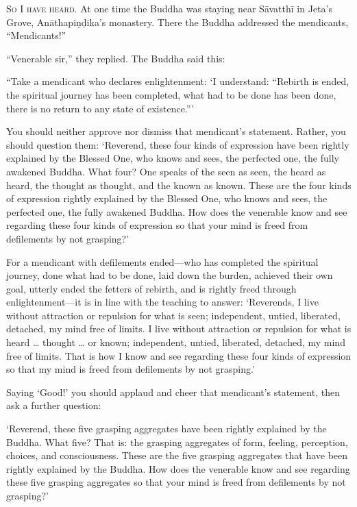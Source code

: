 \documentclass[12pt,openany]{book}%
\newcommand*{\scevam}[1]{\textsc{#1}}
\begin{document}
\scevam{So I have heard. }At one time the Buddha was staying near \textsanskrit{Sāvatthī} in Jeta’s Grove, \textsanskrit{Anāthapiṇḍika}’s monastery. There the Buddha addressed the mendicants, “Mendicants!” 

“Venerable sir,” they replied. The Buddha said this: 

“Take a mendicant who declares enlightenment: ‘I understand: “Rebirth is ended, the spiritual journey has been completed, what had to be done has been done, there is no return to any state of existence.”’ 

You should neither approve nor dismiss that mendicant’s statement. Rather, you should question them: ‘Reverend, these four kinds of expression have been rightly explained by the Blessed One, who knows and sees, the perfected one, the fully awakened Buddha. What four? One speaks of the seen as seen, the heard as heard, the thought as thought, and the known as known. These are the four kinds of expression rightly explained by the Blessed One, who knows and sees, the perfected one, the fully awakened Buddha. How does the venerable know and see regarding these four kinds of expression so that your mind is freed from defilements by not grasping?’ 

For a mendicant with defilements ended—who has completed the spiritual journey, done what had to be done, laid down the burden, achieved their own goal, utterly ended the fetters of rebirth, and is rightly freed through enlightenment—it is in line with the teaching to answer: ‘Reverends, I live without attraction or repulsion for what is seen; independent, untied, liberated, detached, my mind free of limits. I live without attraction or repulsion for what is heard … thought … or known; independent, untied, liberated, detached, my mind free of limits. That is how I know and see regarding these four kinds of expression so that my mind is freed from defilements by not grasping.’ 

Saying ‘Good!’ you should applaud and cheer that mendicant’s statement, then ask a further question: 

‘Reverend, these five grasping aggregates have been rightly explained by the Buddha. What five? That is: the grasping aggregates of form, feeling, perception, choices, and consciousness. These are the five grasping aggregates that have been rightly explained by the Buddha. How does the venerable know and see regarding these five grasping aggregates so that your mind is freed from defilements by not grasping?’ 
\end{document}
